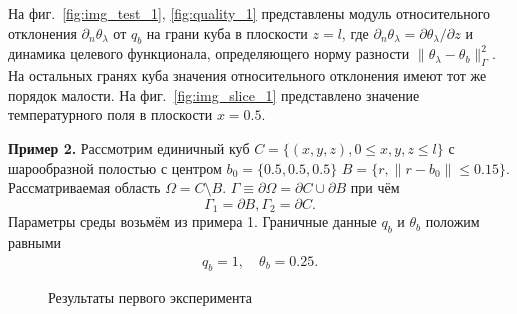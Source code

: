 \documentclass[12pt]{article}
\begin{document}
    \begin{figure}[H]
        \centering
        \label{fig:2}
    \end{figure}

    На фиг.~\ref{fig:img_test_1}, \ref{fig:quality_1} представлены модуль относительного
    отклонения $\partial_n\theta_\lambda$ от $q_b$ на грани куба в плоскости $z=l$,
    где $\partial_n\theta_\lambda=\partial\theta_\lambda/\partial z$ и динамика целевого функционала, определяющего норму
    разности $\|\theta_\lambda -\theta_b\|^2_\Gamma$.
    На остальных гранях куба значения относительного отклонения имеют тот же порядок малости.
    На фиг.~\ref{fig:img_slice_1} представлено значение температурного поля в плоскости $x=0.5$.

    \textbf{Пример 2.}
    Рассмотрим единичный куб $C = \{(x, y, z), 0 \leq x,y,z \leq l\}$ с
    шарообразной полостью с центром $b_0 =\{0.5, 0.5, 0.5\}$
    $B = \{r, \| r - b_0 \| \leq 0.15 \}$.
    Рассматриваемая область $\Omega = C \setminus B$.
    $\Gamma \equiv \partial \Omega = \partial C \cup \partial B$ при чём
    \[
        \Gamma_1 = \partial B,
        \Gamma_2 = \partial C.
    \]
    Параметры среды возьмём из примера 1.
    Граничные данные $q_b$ и $\theta_b$ положим равными
    \begin{gather*}
        q_b = 1, \quad
        \theta_b = 0.25.
    \end{gather*}
    \begin{figure}[H]
        \centering
        \caption{Результаты первого эксперимента}
        \label{fig:3}
    \end{figure}
\end{document}
